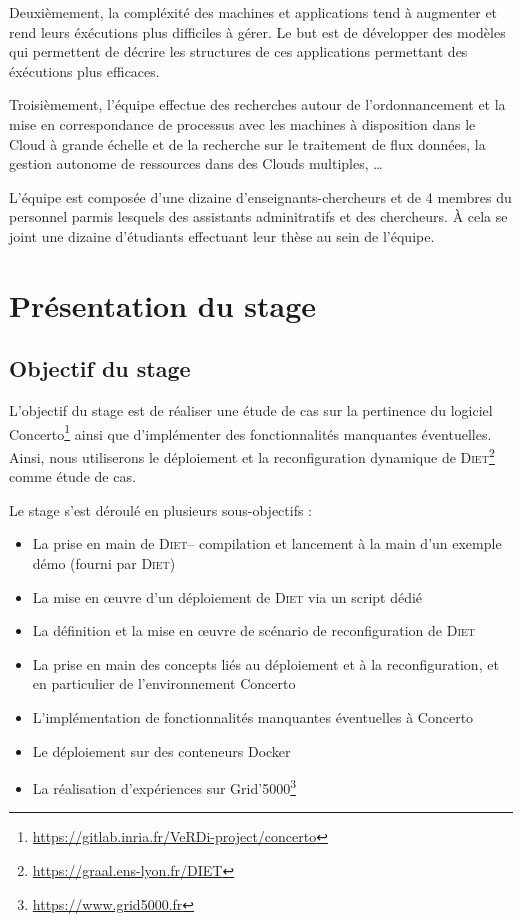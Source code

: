 \documentclass{article}
\newcommand{\cloud}{Cloud\xspace}
\newcommand{\clouds}{Clouds\xspace}
\newcommand{\diet}{\textsc{Diet}\xspace} %
\newcommand{\concerto}{Concerto\xspace}
\newcommand{\gfivek}{Grid'5000\xspace}
\begin{document}
Deuxièmement, la compléxité des machines et applications tend à augmenter et
rend leurs éxécutions plus difficiles à gérer. Le but est de développer des
modèles qui permettent de décrire les structures de ces applications permettant
des éxécutions plus efficaces.

Troisièmement, l'équipe effectue des recherches autour de l'ordonnancement et la
mise en correspondance de processus avec les machines à disposition dans le
\cloud à grande échelle et de la recherche sur le traitement de flux données, la
gestion autonome de ressources dans des \clouds multiples, \dots

L'équipe est composée d'une dizaine d'enseignants-chercheurs et de 4 membres du
personnel parmis lesquels des assistants adminitratifs et des chercheurs. À cela
se joint une dizaine d'étudiants effectuant leur thèse au sein de l'équipe.

\section{Présentation du stage}
\subsection{Objectif du stage}

L’objectif du stage est de réaliser une étude de cas sur la pertinence du
logiciel \concerto\footnote{
\url{https://gitlab.inria.fr/VeRDi-project/concerto}} ainsi que d’implémenter
des fonctionnalités manquantes éventuelles.
Ainsi, nous utiliserons le déploiement et la reconfiguration dynamique de
\diet\footnote{\url{https://graal.ens-lyon.fr/DIET}} comme étude de cas.


Le stage s'est déroulé en plusieurs sous-objectifs :
\begin{itemize}
	\item La prise en main de \diet – compilation et lancement à la main d’un
	exemple démo (fourni par \diet)

	\item La mise en \oe uvre d’un déploiement de \diet via un script dédié

	\item La définition et la mise en \oe uvre de scénario de reconfiguration de
	\diet

	\item La prise en main des concepts liés au déploiement et à la
	reconfiguration, et en particulier de l'environnement \concerto

	\item L’implémentation de fonctionnalités manquantes éventuelles à \concerto

	\item Le déploiement sur des conteneurs Docker

	\item La réalisation d’expériences sur \gfivek\footnote{
	\url{https://www.grid5000.fr}}

\end{itemize}
\end{document}
